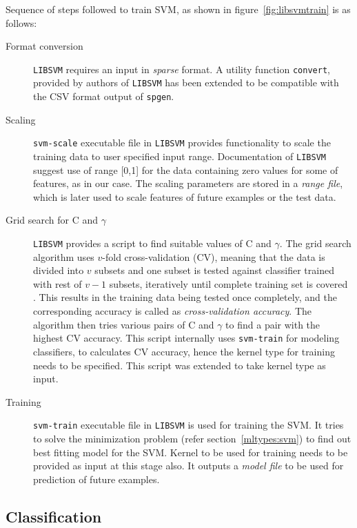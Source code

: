 Sequence of steps followed to train SVM, as shown in figure~\ref{fig:libsvmtrain} is as follows:
\begin{description}
   \item[Format conversion] \texttt{LIBSVM} requires an input in \emph{sparse} format. A utility function \texttt{convert}, provided by authors of \texttt{LIBSVM} has been extended to be compatible with the CSV format output of \texttt{spgen}.

  \item[Scaling] \texttt{svm-scale} executable file in \texttt{LIBSVM} provides functionality to scale the training data to user specified input range. Documentation of \texttt{LIBSVM} \cite{Hsu2003} suggest use of range [0,1] for the data containing zero values for some of features, as in our case. The scaling parameters are stored in a \emph{range file}, which is later used to scale features of future examples or the test data.
  
  \item[Grid search for C and $\gamma$] \texttt{LIBSVM} provides a script to find suitable values of C and $\gamma$. The grid search algorithm uses $v$-fold cross-validation (CV), meaning that the data is divided into $v$ subsets and one subset is tested against classifier trained with rest of $v-1$ subsets, iteratively until complete training set is covered \cite{Hsu2003}. This results in the training data being tested once completely, and the corresponding accuracy is called as \emph{cross-validation accuracy}. The algorithm then tries various pairs of C and $\gamma$ to find a pair with the highest CV accuracy. This script internally uses \texttt{svm-train} for modeling classifiers, to calculates CV accuracy, hence the kernel type for training needs to be specified. This script was extended to take kernel type as input.
 
 \item[Training] \texttt{svm-train} executable file in \texttt{LIBSVM} is used for training the SVM. It tries to solve the minimization problem (refer section~\ref{mltypes:svm}) to find out best fitting model for the SVM. Kernel to be used for training needs to be provided as input at this stage also. It outputs a \emph{model file} to be used for prediction of future examples.
\end{description}

\subsection{Classification}

